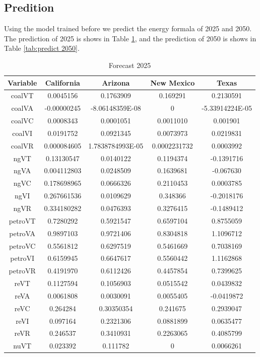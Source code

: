 \documentclass{mcmthesis}
\begin{document}
\subsection{Predition}
Using the model trained before we predict the energy formala of 2025 and 2050.
The prediction of 2025 is shows in Table \ref{tab:predict 2025}, and the prediction of 2050 is shows in Table \ref{tab:predict 2050}.

\begin{table}[!htbp]
\centering
\caption{Forecast 2025}\label{tab:predict 2025}
\begin{tabular}{ccccc}
\toprule
Variable& California& Arizona& New Mexico& Texas\\
\midrule
coalVT&	0.0045156&	0.1763909&	0.169291&	0.2130591 \\
coalVA&	-0.00000245&	-8.06148359E-08&	0&	-5.33914224E-05\\
coalVC&	0.0008343&	0.0001051&	0.0011010&	0.001901\\
coalVI&	0.0191752&	0.0921345&	0.0073973&	0.0219831\\
coalVR&	0.000084605&	1.7838784993E-05&	0.0002231732&	0.0003992\\
ngVT&	0.13130547&	0.0140122&	0.1194374&	-0.1391716\\
ngVA&	0.004112803&	0.0248509&	0.1639681&	-0.067630\\
ngVC&	0.178698965&	0.0666326&	0.2110453&	0.0003785\\
ngVI&	0.267661536&	0.0109629&	0.348366&	-0.2018176\\
ngVR&	0.334180282&	0.0476393&	0.3276415&	-0.1489412\\
petroVT&	0.7280292&	0.5921547&	0.6597104&	0.8755059\\
petroVA&	0.9897103&	0.9721406&	0.8304818&	1.1096712\\
petroVC&	0.5561812&	0.6297519&	0.5461669&	0.7038169\\
petroVI&	0.6159945&	0.6647617&	0.5560442&	1.1162868\\
petroVR&	0.4191970&	0.6112426&	0.4457854&	0.7399625\\
reVT&	0.1127594&	0.1056903&	0.0515542&	0.0439832\\
reVA&	0.0061808&	0.0030091&	0.0055405&	-0.0419872\\
reVC&	0.264284&	0.30350354&	0.241675&	0.2939047\\
reVI&	0.097164&	0.2321306&	0.0881899&	0.0635477\\
reVR&	0.246537&	0.3410931&	0.2263065&	0.4085799\\
nuVT&	0.023392&	0.111782&	0&	0.0066261 \\
\bottomrule
\end{tabular}
\end{table}
\end{document}
